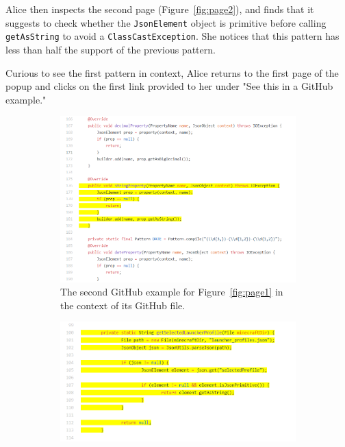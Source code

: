 Alice then inspects the second page (Figure~\ref{fig:page2}), and finds that it suggests to check whether the {\tt JsonElement} object is primitive before calling {\tt getAsString} to avoid a {\tt ClassCastException}. She notices that this pattern has less than half the support of the previous pattern.

Curious to see the first pattern in context, Alice returns to the first page of the popup and clicks on the first link provided to her under "See this in a GitHub example."

\begin{figure}[t!]
\centering
  \begin{subfigure}[t]{0.48\textwidth}
  \includegraphics[width=\textwidth]{json_null_gh2_context.PNG}
  \caption{The second GitHub example for Figure~\ref{fig:page1} in the context of its GitHub file.\protect\footnotemark} 
  \vspace{.1in}
  \label{fig:github1}
  \end{subfigure}
  \hfill
  \begin{subfigure}[t]{0.48\textwidth}
  \includegraphics[width=\textwidth]{json_primitive_gh1.PNG}

\end{subfigure}
\end{figure}
